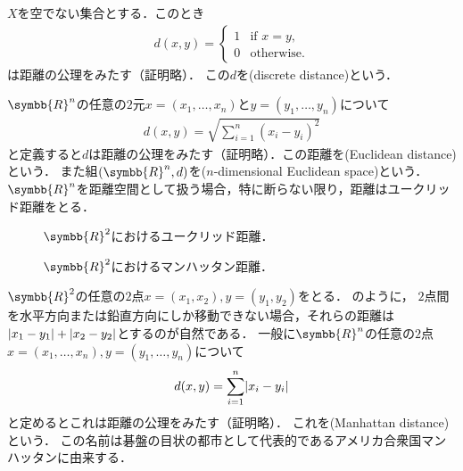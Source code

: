 \documentclass{ltjsbook}
\begin{document}
\begin{exa}
\(X\)を空でない集合とする．このとき
\begin{align*}
    d(x, y) =  \begin{cases} 1 & \text{if \(x = y\),} \\ 0 & \text{otherwise.} \end{cases}
\end{align*}
は距離の公理をみたす（証明略）．
この\(d\)を(discrete distance)という．
\end{exa}

\begin{exa} \(\symbb{R}^n\)の任意の\(2\)元\(x = (x_1, \ldots, x_n)\)と\(y = (y_1, \ldots, y_n)\)について
\begin{align*}
    d(x, y) = \sqrt{\sum_{i = 1}^n (x_i - y_i)^2}
\end{align*}
と定義すると\(d\)は距離の公理をみたす（証明略）．この距離を(Euclidean distance)という．
また組\(\tuple{\symbb{R}^n, d}\)を(\(n\)-dimensional Euclidean space)という．
\(\symbb{R}^n\)を距離空間として扱う場合，特に断らない限り，距離はユークリッド距離をとる．
\end{exa}

\begin{figure}
\begin{minipage}{0.5\textwidth}
    \centering
    
    \caption{\(\symbb{R}^2\)におけるユークリッド距離．}
\end{minipage}
\begin{minipage}{0.5\textwidth}
    \centering
    
    \caption{\(\symbb{R}^2\)におけるマンハッタン距離．}
\end{minipage}
\end{figure}

\begin{exa}
\(\symbb{R}^2\)の任意の\(2\)点\(x = (x_1, x_2), y = (y_1, y_2)\)をとる．
のように，
\(2\)点間を水平方向または鉛直方向にしか移動できない場合，それらの距離は\(\lvert x_1 - y_1 \rvert + \lvert x_2 - y_2 \rvert\)とするのが自然である．
一般に\(\symbb{R}^n\)の任意の\(2\)点\(x = (x_1, \ldots, x_n), y = (y_1, \ldots, y_n)\)について
\begin{align*}
    d(x, y) = \sum_{i = 1}^n \lvert x_i - y_i \rvert
\end{align*}
と定めるとこれは距離の公理をみたす（証明略）．
これを(Manhattan distance)という．
この名前は碁盤の目状の都市として代表的であるアメリカ合衆国マンハッタンに由来する．
\end{exa}
\end{document}

